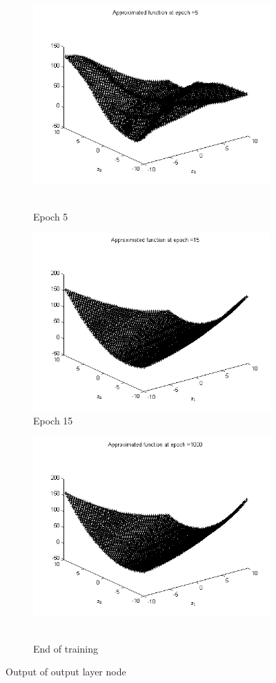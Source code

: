 \begin{figure}
  \begin{subfigure}{.5\textwidth}
  \centering
  \includegraphics[width=.8\linewidth]{Regression/bivariate/1layer_epoch_5.png}\
  \caption{Epoch 5}
\end{subfigure}%
\begin{subfigure}{.5\textwidth}
  \centering
  \includegraphics[width=.8\linewidth]{Regression/bivariate/1layer_epoch_15.png}
   \caption{Epoch 15}
  \end{subfigure}
  
  \begin{subfigure}{.5\textwidth}
  \centering
  \includegraphics[width=.8\linewidth]{Regression/bivariate/1layer_epoch_1000.png}\
  \caption{End of training}
\end{subfigure}%
  
\caption{Output of output layer node}
\end{figure}

